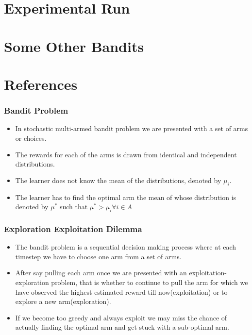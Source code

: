 \documentclass{beamer}
\begin{document}
\section{Experimental Run}
\section{Some Other Bandits} 
\section{References}%


\begin{frame}
\frametitle{Bandit Problem}
\begin{itemize}
\item In stochastic multi-armed bandit problem we are presented with a set of arms or choices. 
\item The rewards for each of the arms is drawn from identical and independent distributions. 
\item The learner does not know the mean of the distributions, denoted by $\mu_{i}$. 
\item The learner has to find the optimal arm the mean of whose distribution is denoted by $\mu^{*}$ such that $\mu^{*}> \mu_{i} \forall i\in A$  
\end{itemize}
\end{frame}



\begin{frame}
\frametitle{Exploration Exploitation Dilemma}
\begin{itemize}
\item The bandit problem is a sequential decision making process where at each timestep we have to choose one arm from a set of arms. 
\item After say pulling each arm once we are presented with an exploitation-exploration problem, that is whether to continue to pull the arm for which we have observed the highest estimated reward till now(exploitation) or to explore a new arm(exploration). 
\item If we become too greedy and always exploit we may miss the chance of actually finding the optimal arm and get stuck with a sub-optimal arm.
\end{itemize}
\end{frame}
\end{document}

